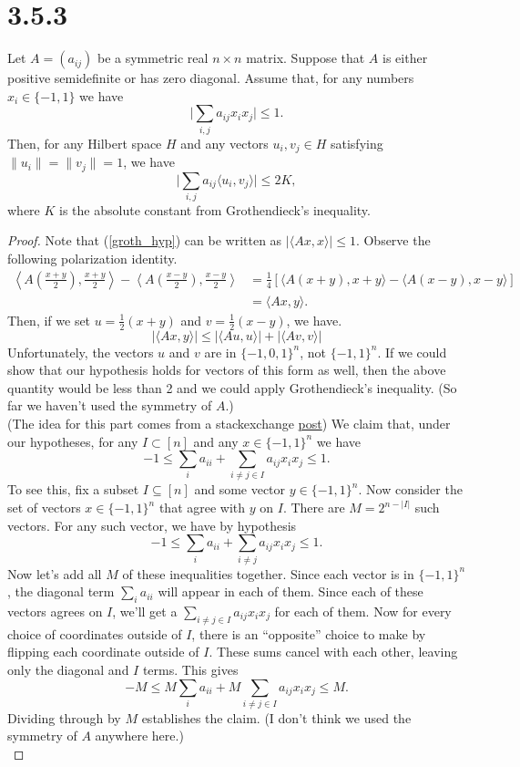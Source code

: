 \documentclass[11pt,letterpaper]{report}
\begin{document}
\section*{3.5.3}
Let $A = (a_{ij})$ be a symmetric real $n\times n$ matrix. Suppose that $A$ is either positive semidefinite or has zero diagonal. Assume that, for any numbers $x_i\in \{-1, 1\}$ we have
\begin{equation}\label{groth_hyp}
\bigg|\sum_{i,j}a_{ij}x_ix_j\bigg|\leq 1.
\end{equation}
Then, for any Hilbert space $H$ and any vectors $u_i,v_j\in H$ satisfying $\|u_i\|=\|v_j\| = 1$, we have
\[
\bigg|\sum_{i,j}a_{ij}\langle u_i, v_j\rangle\bigg|\leq 2K,
\]
where $K$ is the absolute constant from Grothendieck's inequality.
\begin{proof}
	Note that (\ref{groth_hyp}) can be written as $|\langle Ax, x\rangle|\leq 1$. Observe the following polarization identity.
	\begin{align*}
		\left\langle A\left(\frac{x+y}{2}\right),\frac{x+y}{2}\right\rangle - \left\langle A\left(\frac{x-y}{2}\right),\frac{x-y}{2}\right\rangle &= \frac{1}{4}[\langle A(x+y), x+y\rangle -  \langle A(x-y), x-y\rangle]\\
		&= \langle Ax, y\rangle.
	\end{align*}
	Then, if we set $u = \frac{1}{2}(x+y)$ and $v = \frac{1}{2}(x-y)$, we have.
	\begin{equation}\label{groth_goal}
	|\langle Ax, y\rangle|  \leq |\langle Au,u\rangle| + |\langle Av, v\rangle|
	\end{equation}
	Unfortunately, the vectors $u$ and $v$ are in $\{-1, 0, 1\}^n$, not $\{-1, 1\}^n$. If we could show that our hypothesis holds for vectors of this form as well, then the above quantity would be less than 2 and we could apply Grothendieck's inequality. (So far we haven't used the symmetry of $A$.)\\

	(The idea for this part comes from a stackexchange \href{https://math.stackexchange.com/questions/2739932/symmetric-grothendieck-inequality}{post}) We claim that, under our hypotheses, for any $I\subset [n]$ and any $x\in \{-1, 1\}^n$ we have
	\[
	-1 \leq \sum_i a_{ii}+ \sum_{i\neq j\in I}a_{ij}x_ix_j\leq 1.
	\]
	To see this, fix a subset $I\subseteq [n]$ and some vector $y\in \{-1, 1\}^n$. Now consider the set of vectors $x\in \{-1, 1\}^n$ that agree with $y$ on $I$. There are $M = 2^{n - |I|}$ such vectors. For any such vector, we have by hypothesis
	\[
	-1 \leq \sum_{i}a_{ii} + \sum_{i\neq j}a_{ij}x_ix_j\leq 1.
	\]
	Now let's add all $M$ of these inequalities together. Since each vector is in $\{-1, 1\}^n$, the diagonal term $\sum_{i}a_{ii}$ will appear in each of them. Since each of these vectors agrees on $I$, we'll get a $\sum_{i\neq j\in I}a_{ij}x_ix_j$ for each of them. Now for every choice of coordinates outside of $I$, there is an ``opposite'' choice to make by flipping each coordinate outside of $I$. These sums cancel with each other, leaving only the diagonal and $I$ terms. This gives
	\[
	-M\leq M\sum_ia_{ii} + M\sum_{i\neq j\in I}a_{ij}x_ix_j\leq M.
	\]
	Dividing through by $M$ establishes the claim. (I don't think we used the symmetry of $A$ anywhere here.)\\


\end{proof}
\end{document}
